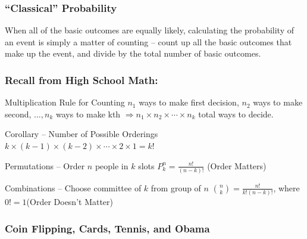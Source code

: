 \documentclass{beamer}
\begin{document}
\begin{frame}

\frametitle{``Classical'' Probability}

When all of the basic outcomes are equally likely, calculating the probability of an event is simply a matter of counting -- count up all the basic outcomes that make up the event, and divide by the total number of basic outcomes.

\end{frame}
\begin{frame}
\frametitle{Recall from High School Math:}

\begin{block}{Multiplication Rule for Counting}
$n_1$ ways to make first decision, $n_2$ ways to make second, $\hdots, n_k$ ways to make kth $\Rightarrow n_1 \times n_2 \times \cdots \times n_k$ total ways to decide. \end{block}
\begin{block}{Corollary -- Number of Possible Orderings}
$k \times(k-1)\times (k-2) \times \cdots\times  2 \times 1 = k!$
\end{block}

\begin{block}{Permutations -- Order $n$ people in $k$ slots}
$P_k^n = \frac{n!}{(n-k)!}$ \hfill \alert{(Order Matters)}\end{block}

\begin{block}{Combinations -- Choose committee of $k$ from group of $n$}
${n \choose k} = \frac{n!}{k! (n-k)!}$, where $0! = 1$\hfill \alert{(Order Doesn't Matter)}\end{block}

\end{frame}

\begin{frame}
\frametitle{Coin Flipping, Cards, Tennis, and Obama}
\end{frame}
\end{document}
